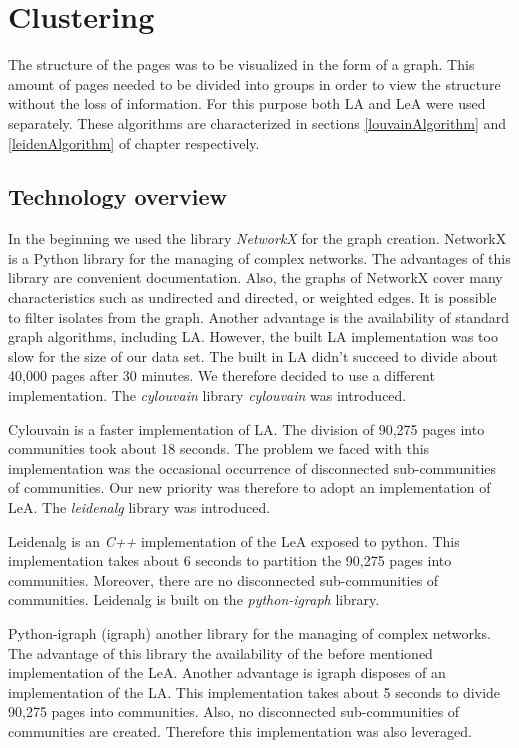 \section{Clustering}\label{ClusteringDevelopment}
The structure of the pages was to be visualized in the form of a graph. This amount of pages needed to be divided into groups in order to view the structure without the loss of information. For this purpose both LA and LeA were used separately. These algorithms are characterized in sections \ref{louvainAlgorithm} and \ref{leidenAlgorithm} of chapter respectively. 

\subsection{Technology overview} \label{ClusteringTechonologyOverview}
In the beginning we used the library \textit{NetworkX} \cite{networkX} for the graph creation. NetworkX is a Python library for the managing of complex networks. The advantages of this library are convenient documentation. Also, the graphs of NetworkX cover many characteristics such as undirected and directed, or weighted edges. It is possible to filter isolates from the graph.  Another advantage is the availability of standard graph algorithms, including LA. However, the built LA implementation was too slow for the size of our data set. The built in LA didn't succeed to divide about 40,000 pages after 30 minutes. We therefore decided to use a different implementation. The \textit{cylouvain} library \textit{cylouvain} was introduced. 

Cylouvain is a faster implementation of LA. The division of 90,275 pages into communities took about 18 seconds. The problem we faced with this implementation was the occasional occurrence of disconnected sub-communities of communities. Our new priority was therefore to adopt an implementation of LeA. The \textit{leidenalg} \cite{leidenalg} library was introduced.

Leidenalg is an \textit{C++} implementation of the LeA exposed to python. This implementation takes about 6 seconds to partition the 90,275 pages into communities. Moreover, there are no disconnected sub-communities of communities. Leidenalg is built on the \textit{python-igraph} library. 

Python-igraph (igraph) another library for the managing of complex networks. The advantage of this library the availability of the before mentioned implementation of the LeA. Another advantage is igraph disposes of an implementation of the LA. This implementation takes about 5 seconds to divide 90,275 pages into communities. Also, no disconnected sub-communities of communities are created. Therefore this implementation was also leveraged.

